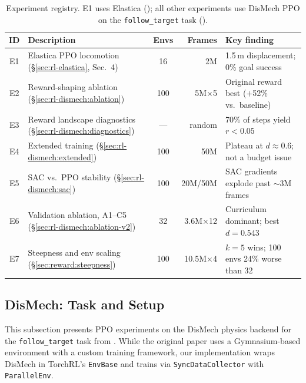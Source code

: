 \documentclass[11pt]{article}
\begin{document}
\begin{table}[H]
  \centering
  \footnotesize
  \renewcommand{\arraystretch}{1.3}
  \caption{Experiment registry. E1 uses Elastica (); all other experiments use DisMech PPO on the \texttt{follow\_target} task ().}
  \label{tab:experiment-registry}
  \begin{tabular}{@{}clcrl@{}}
    \toprule
    \textbf{ID} & \textbf{Description} & \textbf{Envs} & \textbf{Frames} & \textbf{Key finding} \\
    \midrule
    E1 & Elastica PPO locomotion (\S\ref{sec:rl-elastica}, Sec.~4) & 16  & 2M             & 1.5\,m displacement; 0\% goal success \\
    E2 & Reward-shaping ablation (\S\ref{sec:rl-dismech:ablation})   & 100 & 5M$\times$5    & Original reward best ($+$52\% vs.\ baseline) \\
    E3 & Reward landscape diagnostics (\S\ref{sec:rl-dismech:diagnostics}) & --- & random   & 70\% of steps yield $r < 0.05$ \\
    E4 & Extended training (\S\ref{sec:rl-dismech:extended})         & 100 & 50M            & Plateau at $d \approx 0.6$; not a budget issue \\
    E5 & SAC vs.\ PPO stability (\S\ref{sec:rl-dismech:sac})        & 100 & 20M/50M        & SAC gradients explode past ${\sim}$3M frames \\
    E6 & Validation ablation, A1--C5 (\S\ref{sec:rl-dismech:ablation-v2}) & 32 & 3.6M$\times$12 & Curriculum dominant; best $d{=}0.543$ \\
    E7 & Steepness and env scaling (\S\ref{sec:reward:steepness})    & 100 & 10.5M$\times$4 & $k{=}5$ wins; 100 envs 24\% worse than 32 \\
    \bottomrule
  \end{tabular}
\end{table}

\subsection{DisMech: Task and Setup}
\label{sec:rl-dismech}

This subsection presents PPO experiments on the DisMech physics backend for the \texttt{follow\-\_target} task from \citet{Choi2025}.
While the original paper uses a Gymnasium-based environment with a custom training framework, our implementation wraps DisMech in TorchRL's \texttt{EnvBase} and trains via \texttt{Sync\-Data\-Collector} with \texttt{Parallel\-Env}.
\end{document}
